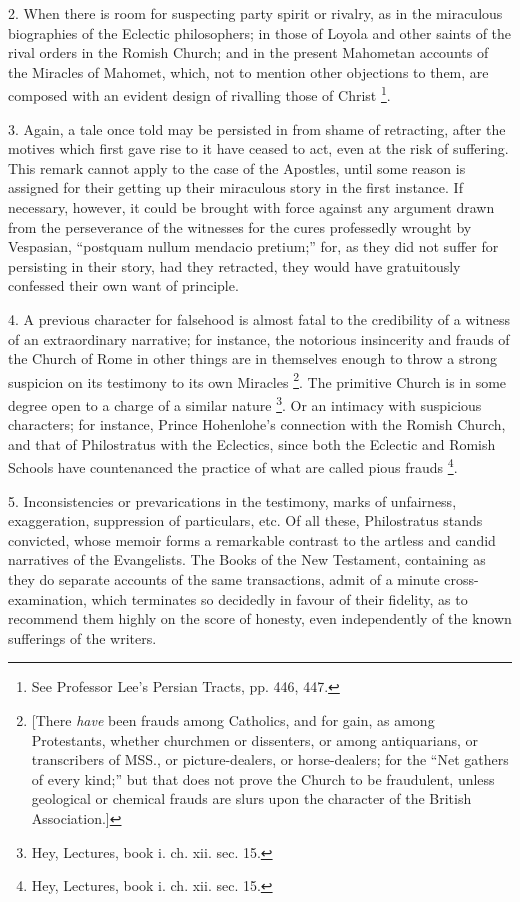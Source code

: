 2. When there is room for suspecting party spirit
or rivalry, as in the miraculous biographies of the Eclectic
philosophers; in those of Loyola and other saints of the rival orders
in the Romish Church; and in the present Mahometan accounts of the
Miracles of Mahomet, which, not to mention other objections to them,
are composed with an evident design of rivalling those of Christ \footnote{See Professor Lee's Persian Tracts, pp. 446, 447.}.

3. Again, a tale once told may be persisted in
from shame of retracting, after the motives which first gave rise to
it have ceased to act, even at the risk of suffering. This remark
cannot apply to the case of the Apostles, until some reason is
assigned for their getting up their miraculous story in the first
instance. If necessary, however, it could be brought with force
against any argument drawn from the perseverance of the witnesses
for the cures professedly wrought by Vespasian, ``postquam nullum
mendacio pretium;'' for, as they did not suffer for persisting in their
story, had they retracted, they would have gratuitously confessed
their own want of principle.

4. A previous character for falsehood is almost
fatal to the credibility of a witness of an extraordinary narrative;
for instance, the notorious insincerity and frauds of the Church of
Rome in other things are in themselves enough to throw a strong
suspicion on its testimony to its own Miracles \footnote{[There \emph{have} been frauds among Catholics, and for gain, as among
Protestants, whether churchmen or dissenters, or among antiquarians,
or transcribers of MSS., or picture-dealers, or horse-dealers; for the
``Net gathers of every kind;'' but that does not prove the Church to be
fraudulent, unless geological or chemical frauds are slurs upon the
character of the British Association.]}. The primitive Church is in some degree open to a charge of a
similar nature \footnote{Hey, Lectures, book i. ch. xii. sec. 15.}. Or an
intimacy with suspicious characters; for instance, Prince Hohenlohe's
connection with the Romish Church, and that of Philostratus with the
Eclectics, since both the Eclectic and Romish Schools have
countenanced the practice of what are called pious frauds \footnote{Hey, Lectures, book i. ch. xii. sec. 15.}.

5. Inconsistencies or prevarications in the
testimony, marks of unfairness, exaggeration, suppression of
particulars, etc. Of all these, Philostratus stands convicted, whose
memoir forms a remarkable contrast to the artless and candid
narratives of the Evangelists. The Books of the New Testament,
containing as they do separate accounts of the same transactions,
admit of a minute cross-examination, which terminates so decidedly in
favour of their fidelity, as to recommend them highly on the score of
honesty, even independently of the known sufferings of the writers.

